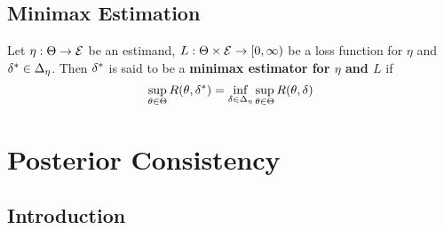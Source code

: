 \documentclass{book}
\begin{document}
	
	
	
	
	
	
	
	
	
	
	
	
	
	
	
	
	
	
	
	
	
	
	
	
	
	
	
	
	
	
	
	
	
	
	
	
	
	
	
	
	
	\newpage
	\subsection{Minimax Estimation}
	
	\begin{defn}
		Let $\eta: \Theta \rightarrow \mathcal{E}$ be an estimand, $L: \Theta \times \mathcal{E} \rightarrow [0,\infty)$ be a loss function for $\eta$ and $\delta^* \in \Delta_{\eta}$. Then $\delta^*$ is said to be a \textbf{minimax estimator for $\eta$ and $L$} if 
		$$\sup_{\theta \in \Theta}R(\theta, \delta^*) = \inf_{\delta \in \Delta_{\eta}} \sup_{\theta \in \Theta}R(\theta, \delta)  $$
	\end{defn}
	
	
	
	
	
	
	
	
	
	
	
	
	
	
	
	
	
	
	
	
	
	
	
	
	
	
	\newpage
	\section{Posterior Consistency}
	
	\subsection{Introduction}
	
\end{document}
